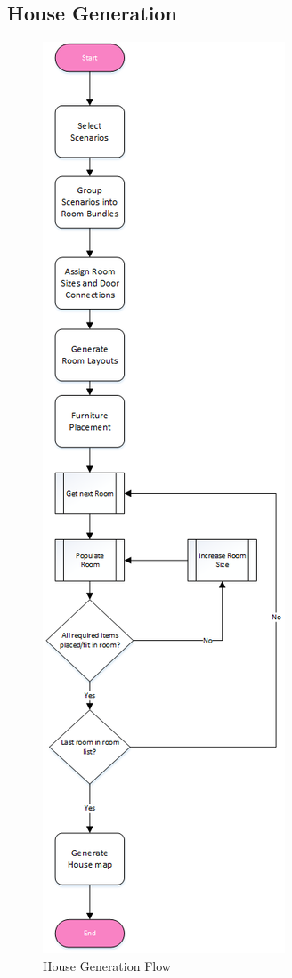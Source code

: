 \subsection{House Generation}
\begin{figure}[H]
\centering\includegraphics[width=0.95\linewidth, height=0.7\paperheight, keepaspectratio=true]{images/RoomGeneration_HouseGeneration_Flowchart}
  \caption{House Generation Flow}
  \label{fig:flow_house_generation}
\end{figure}

